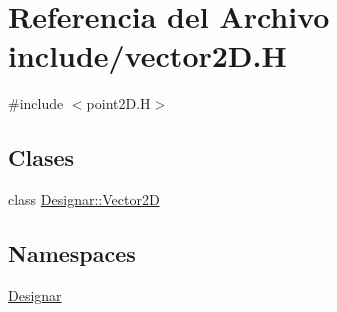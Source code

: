 \hypertarget{vector2_d_8_h}{}\section{Referencia del Archivo include/vector2D.H}
\label{vector2_d_8_h}
{\ttfamily \#include $<$point2\+D.\+H$>$}\newline
\subsection*{Clases}
\begin{DoxyCompactItemize}
\item 
class \hyperlink{class_designar_1_1_vector2_d}{Designar\+::\+Vector2D}
\end{DoxyCompactItemize}
\subsection*{Namespaces}
\begin{DoxyCompactItemize}
\item 
 \hyperlink{namespace_designar}{Designar}
\end{DoxyCompactItemize}

